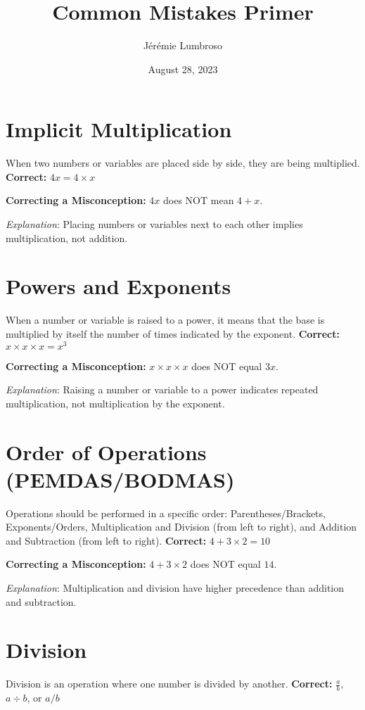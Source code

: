 \documentclass[12pt]{article}
\title{Common Mistakes Primer}
\author{Jérémie Lumbroso}
\date{August 28, 2023}
\begin{document}
\maketitle

\section*{Implicit Multiplication}
When two numbers or variables are placed side by side, they are being multiplied.
\textbf{Correct:} \(4x = 4 \times x\)

\textbf{Correcting a Misconception:} \(4x\) does NOT mean \(4 + x\).

\textit{Explanation}: Placing numbers or variables next to each other implies multiplication, not addition.

\section*{Powers and Exponents}
When a number or variable is raised to a power, it means that the base is multiplied by itself the number of times indicated by the exponent.
\textbf{Correct:} \(x \times x \times x = x^3\)

\textbf{Correcting a Misconception:} \(x \times x \times x\) does NOT equal \(3x\).

\textit{Explanation}: Raising a number or variable to a power indicates repeated multiplication, not multiplication by the exponent.

\section*{Order of Operations (PEMDAS/BODMAS)}
Operations should be performed in a specific order: Parentheses/Brackets, Exponents/Orders, Multiplication and Division (from left to right), and Addition and Subtraction (from left to right).
\textbf{Correct:} \(4 + 3 \times 2 = 10\)

\textbf{Correcting a Misconception:} \(4 + 3 \times 2\) does NOT equal \(14\).

\textit{Explanation}: Multiplication and division have higher precedence than addition and subtraction.

\section*{Division}
Division is an operation where one number is divided by another.
\textbf{Correct:} \(\frac{a}{b}\), \(a \div b\), or \(a/b\)
\end{document}
